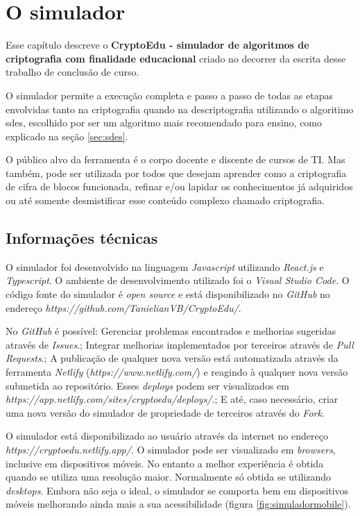 \chapter{O simulador}
\label{char:ferrdesenvolvida}
Esse capítulo descreve o \textbf{CryptoEdu - simulador de algoritmos de criptografia com finalidade educacional} criado no decorrer da escrita desse trabalho de conclusão de curso.

O simulador permite a execução completa e passo a passo de todas as etapas envolvidas tanto na criptografia quando na descriptografia utilizando o algoritimo \acrfull{sdes}, escolhido por ser um algoritmo mais recomendado para ensino, como explicado na seção \ref{sec:sdes}.

O público alvo da ferramenta é o corpo docente e discente de cursos de TI. Mas também, pode ser utilizada por todos que desejam aprender como a criptografia de cifra de blocos funcionada, refinar e/ou lapidar os conhecimentos já adquiridos ou até somente desmistificar esse conteúdo complexo chamado criptografia.

\section{Informações técnicas}

O simulador foi desenvolvido na linguagem \textit{Javascript} utilizando \textit{React.js} e \textit{Typescript}. O ambiente de desenvolvimento utilizado foi o \textit{Visual Studio Code}. O código fonte do simulador é \textit{open source} e está disponibilizado no \textit{GitHub} no endereço \textit{https://github.com/TanielianVB/CryptoEdu/}.

No \textit{GitHub} é possível: Gerenciar problemas encontrados e melhorias sugeridas através de \textit{Issues}.; Integrar melhorias implementados por terceiros através de \textit{Pull Requests}.; A publicação de qualquer nova versão está automatizada através da ferramenta \textit{Netlify} (\textit{https://www.netlify.com/}) e reagindo à qualquer nova versão submetida ao repositório. Esses \textit{deploys} podem ser visualizados em \textit{https://app.netlify.com/sites/cryptoedu/deploys/}.; E até, caso necessário, criar uma nova versão do simulador de propriedade de terceiros através do \textit{Fork}.

O simulador está disponibilizado ao usuário através da internet no endereço \textit{https://cryptoedu.netlify.app/}. O simulador pode ser visualizado em \textit{browsers}, inclusive em dispositivos móveis. No entanto a melhor experiência é obtida quando se utiliza uma resolução maior. Normalmente só obtida se utilizando \textit{desktops}. Embora não seja o ideal, o simulador se comporta bem em dispositivos móveis melhorando ainda mais a sua acessibilidade (figura \ref{fig:simuladormobile}).

